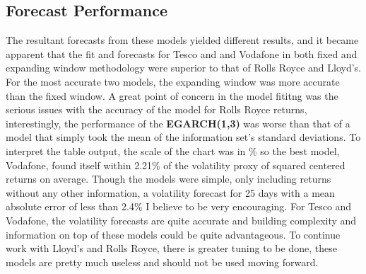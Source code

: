 \subsection{Forecast Performance}
The resultant forecasts from these models yielded different results, and it became apparent that the fit and forecasts for Tesco and and Vodafone in both fixed and expanding window methodology were superior to that of Rolls Royce and Lloyd's. For the most accurate two models, the expanding window was more accurate than the fixed window. A great point of concern in the model fititng was the serious issues with the accuracy of the model for Rolls Royce returns, interestingly, the performance of the \textbf{EGARCH(1,3)} was worse than that of a model that simply took the mean of the information set's standard deviations. To interpret the table output, the scale of the chart was in \% so the best model, Vodafone, found itself within 2.21\% of the volatility proxy of squared centered returns on average. Though the models were simple, only including returns without any other information, a volatility forecast for 25 days with a mean absolute error of less than 2.4\% I believe to be very encouraging. For Tesco and Vodafone, the volatility forecasts are quite accurate and building complexity and information on top of these models could be quite advantageous. To continue work with Lloyd's and Rolls Royce, there is greater tuning to be done, these models are pretty much useless and should not be used moving forward.  
